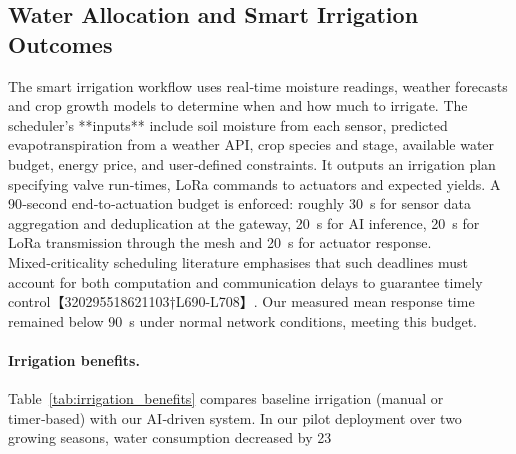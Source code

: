 \documentclass[12pt,onecolumn]{IEEEtran} %
\begin{document}
\subsection{Water Allocation and Smart Irrigation Outcomes}
\label{sec:water_allocation}

The smart irrigation workflow uses real‑time moisture readings, weather forecasts and crop growth models to determine when and how much to irrigate.  The scheduler’s **inputs** include soil moisture from each sensor, predicted evapotranspiration from a weather API, crop species and stage, available water budget, energy price, and user‑defined constraints.  It outputs an irrigation plan specifying valve run‑times, LoRa commands to actuators and expected yields.  A 90‑second end‑to‑actuation budget is enforced: roughly 30~s for sensor data aggregation and deduplication at the gateway, 20~s for AI inference, 20~s for LoRa transmission through the mesh and 20~s for actuator response.  Mixed‑criticality scheduling literature emphasises that such deadlines must account for both computation and communication delays to guarantee timely control【320295518621103†L690-L708】.  Our measured mean response time remained below \SI{90}{s} under normal network conditions, meeting this budget.

\paragraph{Irrigation benefits.}
Table~\ref{tab:irrigation_benefits} compares baseline irrigation (manual or timer‑based) with our AI‑driven system.  In our pilot deployment over two growing seasons, water consumption decreased by 23~%
\end{document}
